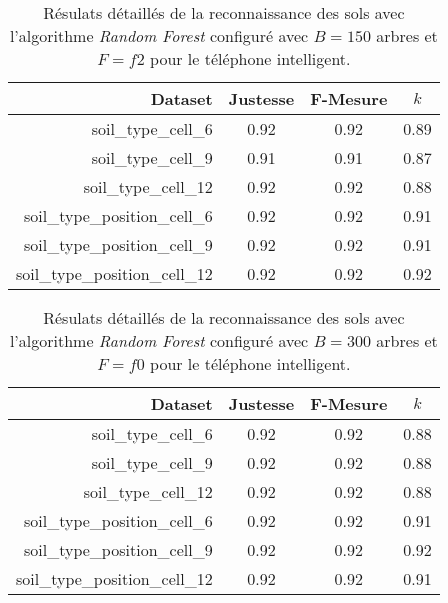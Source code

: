 \begin{table}[H]\renewcommand{\arraystretch}{0.5}
	\centering
	\caption{Résulats détaillés de la reconnaissance des sols avec l'algorithme \textit{Random Forest} configuré avec $B=150$ arbres et $F=f2$ pour le téléphone intelligent.}
	\label{tab:rf-150-f2-cell}
	\begin{tabular}{@{}rccc@{}}
		\toprule
			\textbf{Dataset} & \textbf{Justesse} & \textbf{F-Mesure} & \textbf{$k$} \\
		\midrule
			soil\_type\_cell\_6 & 0.92 & 0.92 & 0.89 \\
			soil\_type\_cell\_9 & 0.91 & 0.91 & 0.87 \\
			soil\_type\_cell\_12 & 0.92 & 0.92 & 0.88 \\
			soil\_type\_position\_cell\_6 & 0.92 & 0.92 & 0.91 \\
			soil\_type\_position\_cell\_9 & 0.92 & 0.92 & 0.91 \\
			soil\_type\_position\_cell\_12 & 0.92 & 0.92 & 0.92 \\
		\bottomrule
	\end{tabular}
\end{table}

\begin{table}[H]\renewcommand{\arraystretch}{0.5}
	\centering
	\caption{Résulats détaillés de la reconnaissance des sols avec l'algorithme \textit{Random Forest} configuré avec $B=300$ arbres et $F=f0$ pour le téléphone intelligent.}
	\label{tab:rf-300-f0-cell}
	\begin{tabular}{@{}rccc@{}}
		\toprule
			\textbf{Dataset} & \textbf{Justesse} & \textbf{F-Mesure} & \textbf{$k$} \\
		\midrule
			soil\_type\_cell\_6 & 0.92 & 0.92 & 0.88 \\
			soil\_type\_cell\_9 & 0.92 & 0.92 & 0.88 \\
			soil\_type\_cell\_12 & 0.92 & 0.92 & 0.88 \\
			soil\_type\_position\_cell\_6 & 0.92 & 0.92 & 0.91 \\
			soil\_type\_position\_cell\_9 & 0.92 & 0.92 & 0.92 \\
			soil\_type\_position\_cell\_12 & 0.92 & 0.92 & 0.91 \\
		\bottomrule
	\end{tabular}
\end{table}

